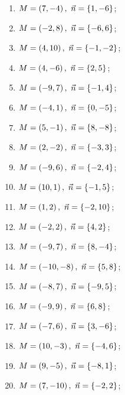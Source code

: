 	\begin{multicols}{2}
		\begin{enumerate}
			\setcounter{enumi}{\value{tasks}}
					
				\item \( \displaystyle M = \left( 7, -4 \right), ~ \vec{n} = \left\lbrace 1, -6 \right\rbrace \);
				\item \( \displaystyle M = \left( -2, 8 \right), ~ \vec{n} = \left\lbrace -6, 6 \right\rbrace \);
				\item \( \displaystyle M = \left( 4, 10 \right), ~ \vec{n} = \left\lbrace -1, -2 \right\rbrace \);
				\item \( \displaystyle M = \left( 4, -6 \right), ~ \vec{n} = \left\lbrace 2, 5 \right\rbrace \);
				\item \( \displaystyle M = \left( -9, 7 \right), ~ \vec{n} = \left\lbrace -1, 4 \right\rbrace \);
				\item \( \displaystyle M = \left( -4, 1 \right), ~ \vec{n} = \left\lbrace 0, -5 \right\rbrace \);
				\item \( \displaystyle M = \left( 5, -1 \right), ~ \vec{n} = \left\lbrace 8, -8 \right\rbrace \);
				\item \( \displaystyle M = \left( 2, -2 \right), ~ \vec{n} = \left\lbrace -3, 3 \right\rbrace \);
				\item \( \displaystyle M = \left( -9, 6 \right), ~ \vec{n} = \left\lbrace -2, 4 \right\rbrace \);
				\item \( \displaystyle M = \left( 10, 1 \right), ~ \vec{n} = \left\lbrace -1, 5 \right\rbrace \);
				\item \( \displaystyle M = \left( 1, 2 \right), ~ \vec{n} = \left\lbrace -2, 10 \right\rbrace \);
				\item \( \displaystyle M = \left( -2, 2 \right), ~ \vec{n} = \left\lbrace 4, 2 \right\rbrace \);
				\item \( \displaystyle M = \left( -9, 7 \right), ~ \vec{n} = \left\lbrace 8, -4 \right\rbrace \);
				\item \( \displaystyle M = \left( -10, -8 \right), ~ \vec{n} = \left\lbrace 5, 8 \right\rbrace \);
				\item \( \displaystyle M = \left( -8, 7 \right), ~ \vec{n} = \left\lbrace -9, 5 \right\rbrace \);
				\item \( \displaystyle M = \left( -9, 9 \right), ~ \vec{n} = \left\lbrace 6, 8 \right\rbrace \);
				\item \( \displaystyle M = \left( -7, 6 \right), ~ \vec{n} = \left\lbrace 3, -6 \right\rbrace \);
				\item \( \displaystyle M = \left( 10, -3 \right), ~ \vec{n} = \left\lbrace -4, 6 \right\rbrace \);
				\item \( \displaystyle M = \left( 9, -5 \right), ~ \vec{n} = \left\lbrace -8, 1 \right\rbrace \);
				\item \( \displaystyle M = \left( 7, -10 \right), ~ \vec{n} = \left\lbrace -2, 2 \right\rbrace \);

			\setcounter{tasks}{\value{enumi}}
		\end{enumerate}
	\end{multicols}

